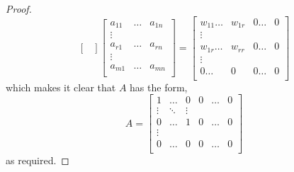 \documentclass[MathsNotesBase.tex]{subfiles}
\begin{document}
{\begin{proof}
\[\begin{bmatrix}
				\end{bmatrix}
				\begin{bmatrix}
				a_{11} & \dots & a_{1n} \\
				\vdots &  &  \\
				a_{r1} & \dots & a_{rn} \\
				\vdots &  &  \\
				a_{m1} & \dots & a_{mn} \\
				\end{bmatrix}
				= 
				\begin{bmatrix}
				w_{11} \dots & w_{1r} & 0 \dots & 0 \\
				\vdots &  &  &  \\
				w_{1r} \dots & w_{rr} & 0 \dots & 0 \\
				\vdots &  &  &  \\
				0 \dots & 0 & 0 \dots & 0 \\
				\end{bmatrix}
			\]
			which makes it clear that $A$ has the form,
			\[ A =
				\begin{bmatrix}
				1 & \dots & 0 & 0 & \dots & 0 \\
				\vdots & \ddots & \vdots & &  \\
				0 & \dots & 1 & 0 & \dots & 0 \\
				\vdots &  & & &  \\
				0 & \dots & 0 & 0 & \dots & 0 \\
				\end{bmatrix}
			\]
			as required.
		\end{proof}
		
	}



\end{document}
